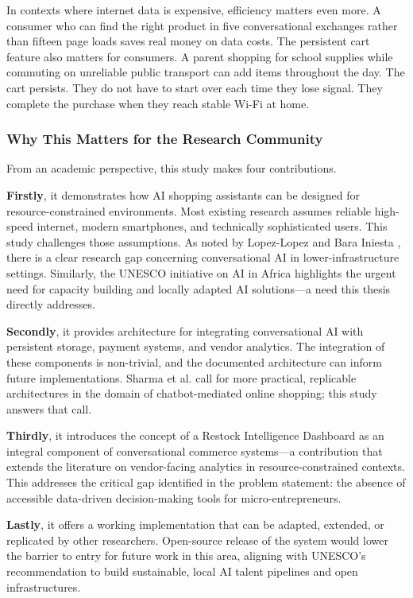 \documentclass[12pt,a4paper]{article}
\begin{document}
In contexts where internet data is expensive, efficiency matters even more. A consumer who can find the right product in five conversational exchanges rather than fifteen page loads saves real money on data costs. The persistent cart feature also matters for consumers. A parent shopping for school supplies while commuting on unreliable public transport can add items throughout the day. The cart persists. They do not have to start over each time they lose signal. They complete the purchase when they reach stable Wi-Fi at home.

\subsubsection{Why This Matters for the Research Community}

From an academic perspective, this study makes four contributions.

\textbf{Firstly}, it demonstrates how AI shopping assistants can be designed for resource-constrained environments. Most existing research assumes reliable high-speed internet, modern smartphones, and technically sophisticated users. This study challenges those assumptions. As noted by Lopez-Lopez and Bara Iniesta \citep{lopez2025}, there is a clear research gap concerning conversational AI in lower-infrastructure settings. Similarly, the UNESCO \citep{unesco2025} initiative on AI in Africa highlights the urgent need for capacity building and locally adapted AI solutions---a need this thesis directly addresses.

\textbf{Secondly}, it provides architecture for integrating conversational AI with persistent storage, payment systems, and vendor analytics. The integration of these components is non-trivial, and the documented architecture can inform future implementations. Sharma et al. \citep{sharma2025} call for more practical, replicable architectures in the domain of chatbot-mediated online shopping; this study answers that call.

\textbf{Thirdly}, it introduces the concept of a Restock Intelligence Dashboard as an integral component of conversational commerce systems---a contribution that extends the literature on vendor-facing analytics in resource-constrained contexts. This addresses the critical gap identified in the problem statement: the absence of accessible data-driven decision-making tools for micro-entrepreneurs.

\textbf{Lastly}, it offers a working implementation that can be adapted, extended, or replicated by other researchers. Open-source release of the system would lower the barrier to entry for future work in this area, aligning with UNESCO's \citep{unesco2025} recommendation to build sustainable, local AI talent pipelines and open infrastructures.
\end{document}
